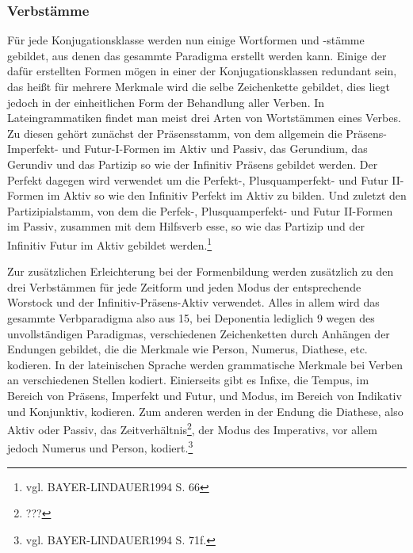 \documentclass[12pt,abstract=on]{scrreprt}
\begin{document}
\subsubsection{Verbstämme}
Für jede Konjugationsklasse werden nun einige Wortformen und -stämme gebildet, aus denen das gesammte Paradigma erstellt werden kann. Einige der dafür erstellten Formen mögen in einer der Konjugationsklassen redundant sein, das heißt für mehrere Merkmale wird die selbe Zeichenkette gebildet, dies liegt jedoch in der einheitlichen Form der Behandlung aller Verben. In Lateingrammatiken findet man meist drei Arten von Wortstämmen eines Verbes. Zu diesen gehört zunächst der Präsensstamm, von dem allgemein die Präsens- Imperfekt- und Futur-I-Formen im Aktiv und Passiv, das Gerundium, das Gerundiv und das Partizip so wie der Infinitiv Präsens gebildet werden. Der Perfekt dagegen wird verwendet um die Perfekt-, Plusquamperfekt- und Futur II-Formen im Aktiv so wie den Infinitiv Perfekt im Aktiv zu bilden. Und zuletzt den Partizipialstamm, von dem die Perfek-, Plusquamperfekt- und Futur II-Formen im Passiv, zusammen mit dem Hilfsverb esse, so wie das Partizip und der Infinitiv Futur im Aktiv gebildet werden.\footnote{vgl. BAYER-LINDAUER1994 S. 66} \par
Zur zusätzlichen Erleichterung bei der Formenbildung werden zusätzlich zu den drei Verbstämmen für jede Zeitform und jeden Modus der entsprechende Worstock und der Infinitiv-Präsens-Aktiv verwendet. Alles in allem wird das gesammte Verbparadigma also aus 15, bei Deponentia lediglich 9 wegen des unvollständigen Paradigmas, verschiedenen Zeichenketten durch Anhängen der Endungen gebildet, die die Merkmale wie Person, Numerus, Diathese, etc. kodieren. In der lateinischen Sprache werden grammatische Merkmale bei Verben an verschiedenen Stellen kodiert. Einierseits gibt es Infixe, die Tempus, im Bereich von Präsens, Imperfekt und Futur, und Modus, im Bereich von Indikativ und Konjunktiv, kodieren. Zum anderen werden in der Endung die Diathese, also Aktiv oder Passiv, das Zeitverhältnis\footnote{???}, der Modus des Imperativs, vor allem jedoch Numerus und Person, kodiert.\footnote{vgl. BAYER-LINDAUER1994 S. 71f.} \par
\end{document}
